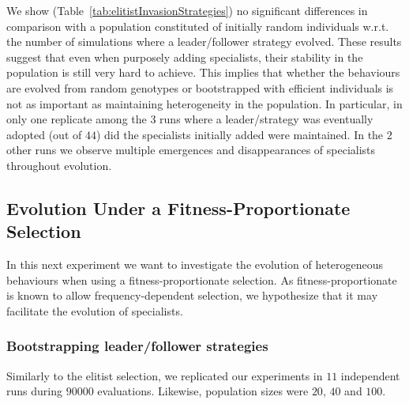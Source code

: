       We show (Table~\ref{tab:elitistInvasionStrategies}) no significant differences in comparison with a population constituted of initially random individuals w.r.t. the number of simulations where a leader/follower strategy evolved. These results suggest that even when purposely adding specialists, their stability in the population is still very hard to achieve. This implies that whether the behaviours are evolved from random genotypes or bootstrapped with efficient individuals is not as important as maintaining heterogeneity in the population. In particular, in only one replicate among the $3$ runs where a leader/strategy was eventually adopted (out of $44$) did the specialists initially added were maintained. In the $2$ other runs we observe multiple emergences and disappearances of specialists throughout evolution. 



  \subsection{Evolution Under a Fitness-Proportionate Selection}
  \label{sec:fitpropEvolution}
    In this next experiment we want to investigate the evolution of heterogeneous behaviours when using a fitness-proportionate selection. As fitness-proportionate is known to allow frequency-dependent selection, we hypothesize that it may facilitate the evolution of specialists.

    \subsubsection{Bootstrapping leader/follower strategies}
      Similarly to the elitist selection, we replicated our experiments in $11$ independent runs during $90000$ evaluations. Likewise, population sizes were $20$, $40$ and $100$. 
      
